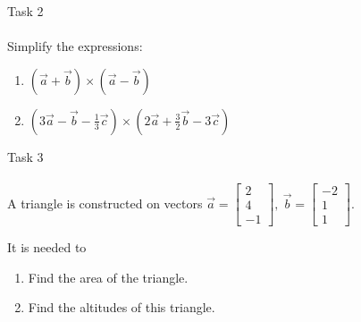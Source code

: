 \documentclass[aspectratio=169,notes]{beamer}
\begin{document}
\begin{frame}[t]{Task 2}
    \framesubtitle{}
    Simplify the expressions:
    \begin{enumerate}
        \item $(\vec{a}+\vec{b})\times(\vec{a}-\vec{b})$
        \item  $(3\vec{a} - \vec{b} - \frac{1}{3}\vec{c}) \times (2\vec{a} + \frac{3}{2}\vec{b} - 3\vec{c})$
    \end{enumerate}
\end{frame}

\begin{frame}[t]{Task 3}
\framesubtitle{}
A triangle is constructed on vectors $\vec{a} = \begin{bmatrix}2\\4\\-1\end{bmatrix},\ \vec{b} = \begin{bmatrix}-2\\1\\1\end{bmatrix}$.

It is needed to
\begin{enumerate}
    \item Find the area of the triangle.
    \item Find the altitudes of this triangle.
\end{enumerate}
\end{frame}
\end{document}
